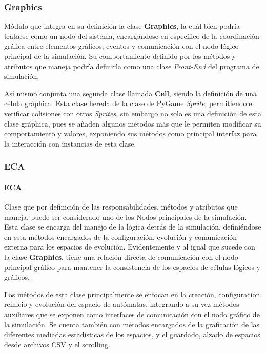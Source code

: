 \documentclass[]{article}
\begin{document}
		\subsubsection{Graphics}
			Módulo que integra en su definición la clase \textbf{Graphics}, la cuál bien podría tratarse como un nodo del sistema, encargándose en específico de la coordinación gráfica entre elementos gráficos, eventos y comunicación con el nodo lógico principal de la simulación. Su comportamiento definido por los métodos y atributos que maneja podría definirla como una clase \textit{Front-End} del programa de simulación.
			
			Así mismo conjunta una segunda clase llamada \textbf{Cell}, siendo la definición de una célula gráphica. Esta clase hereda de la clase de PyGame \textit{Sprite}, permitiendole verificar colisiones con otros \textit{Sprites}, sin embargo no solo es una definición de esta clase gráphica, pues se añaden algunos métodos más que le permiten modificar su comportamiento y valores, exponiendo sus métodos como principal interfaz para la interacción con instancias de esta clase.
			
			
		\subsubsection{ECA}
			\paragraph{ECA}
				Clase que por definición de las responsabilidades, métodos y atributos que maneja, puede ser considerado uno de los Nodos principales de la simulación. Esta clase se encarga del manejo de la lógica detrás de la simulación, definiéndose en esta métodos encargados de la configuración, evolución y comunicación externa para los espacios de evolución. Evidentemente y al igual que sucede con la clase \textbf{Graphics}, tiene una relación directa de comunicación con el nodo principal gráfico para mantener la consistencia de los espacios de células lógicos y gráficos.
				
				Los métodos de esta clase principalmente se enfocan en la creación, configuración, reinicio y evolución del espacio de autómatas, integrando a su vez métodos auxiliares que se exponen como interfaces de comunicación con el nodo gráfico de la simulación.
				Se cuenta también con métodos encargados de la graficación de las diferentes mediadas estadísticas de los espacios, y el guardado, alzado de espacios desde archivos CSV y el scrolling.
			
\end{document}
